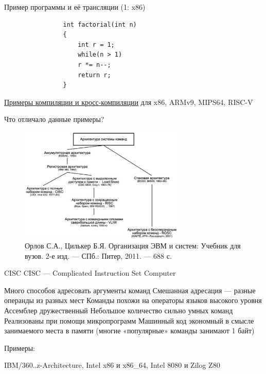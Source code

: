 \documentclass[xetex,aspectratio=43]{beamer}
\begin{document}
\begin{frame}[fragile]{Пример программы и её трансляции (1: x86)}
    \begin{center}
        \begin{minipage}{0.4\linewidth}
            \begin{verbatim}
                int factorial(int n)
                {
                    int r = 1;
                    while(n > 1)
                    r *= n--;
                    return r;
                }
            \end{verbatim}
        \end{minipage}
    \end{center}

\href{https://github.com/dluciv/Computer_Architecture-SPbU-CB.5080/tree/main/examples/cross-compiling}{Примеры компиляции и кросс-компиляции} для x86, ARMv9, MIPS64, RISC-V

\end{frame}

\begin{frame}{Что отличало данные примеры?}
    \begin{figure}
    \includegraphics[width=0.7\textwidth]{img/11.instr_sets.png}
    \caption{Орлов С.А., Цилькер Б.Я. Организация ЭВМ и систем: Учебник для вузов. 2-е изд. — СПб.: Питер, 2011. — 688 с.}
    \end{figure}
\end{frame}

\begin{frame}{CISC}
    CISC — Complicated Instruction Set Computer

    \begin{outline}[itemize]
        \1 Много способов адресовать аргументы команд
            \2 Смешанная адресация — разные операнды из разных мест
            \2 Команды похожи на операторы языков высокого уровня
        \1 Ассемблер дружественный
        \1 Небольшое количество сильно умных команд
            \2 Реализованы при помощи микропрограмм
        \1 Машинный код экономный в смысле занимаемого места в памяти (многие «популярные» команды занимают 1 байт)
    \end{outline}

    Примеры:

    IBM/360..z-Architecture, Intel x86 и x86\_64, Intel 8080 и Zilog Z80
\end{frame}
\end{document}
